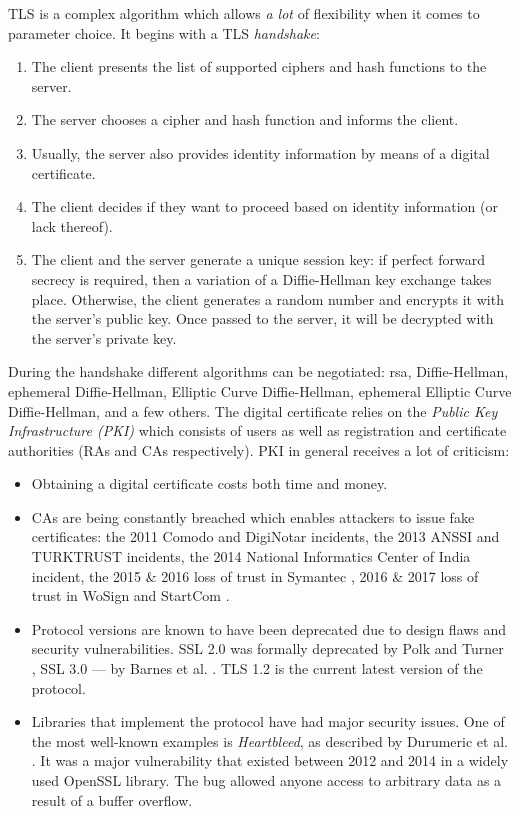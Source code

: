 TLS is a complex algorithm which allows \emph{a lot} of flexibility when it comes to parameter choice. It begins with a TLS \emph{handshake}:

\begin{enumerate}
    \item The client presents the list of supported ciphers and hash functions to the server.
    \item The server chooses a cipher and hash function and informs the client.
    \item Usually, the server also provides identity information by means of a digital certificate.
    \item The client decides if they want to proceed based on identity information (or lack thereof).
    \item The client and the server generate a unique session key: if perfect forward secrecy is required, then a variation of a Diffie-Hellman key exchange takes place. Otherwise, the client generates a random number and encrypts it with the server's public key. Once passed to the server, it will be decrypted with the server's private key.
  \end{enumerate}

During the handshake different algorithms can be negotiated: \gls{rsa}, Diffie-Hellman, ephemeral Diffie-Hellman, Elliptic Curve Diffie-Hellman, ephemeral Elliptic Curve Diffie-Hellman, and a few others. The digital certificate relies on the \emph{Public Key Infrastructure (PKI)} which consists of users as well as registration and certificate authorities (RAs and CAs respectively). PKI in general receives a lot of criticism:

\begin{itemize}
    \item Obtaining a digital certificate costs both time and money.
    \item CAs are being constantly breached which enables attackers to issue fake certificates: the 2011 Comodo \cite{comodo:2017:ca-incident} and DigiNotar \cite{diginotar:2017:ca-incident} incidents, the 2013 ANSSI \cite{anssi:2017:ca-incident} and TURKTRUST \cite{turktrust:2017:ca-incident-0} incidents, the 2014 National Informatics Center of India \cite{nic:2017:ca-incident} incident, the 2015 \& 2016 loss of trust in Symantec \cite{symantec:2017:ca-incident-0, symantec:2017:ca-incident-1}, 2016 \& 2017 loss of trust in WoSign and StartCom \cite{startcom:2017:ca-incident-0, startcom:2017:ca-incident-1}.
    \item Protocol versions are known to have been deprecated due to design flaws and security vulnerabilities. SSL 2.0 was formally deprecated by Polk and Turner \cite{rfc6176}, SSL 3.0  --- by Barnes et al. \cite{rfc7568}. TLS 1.2 is the current latest version of the protocol.
    \item Libraries that implement the protocol have had major security issues. One of the most well-known examples is \emph{Heartbleed}, as described by Durumeric et al. \cite{durumeric2014matter}. It was a major vulnerability that existed between 2012 and 2014 in a widely used OpenSSL library. The bug allowed anyone access to arbitrary data as a result of a buffer overflow.
  \end{itemize}

